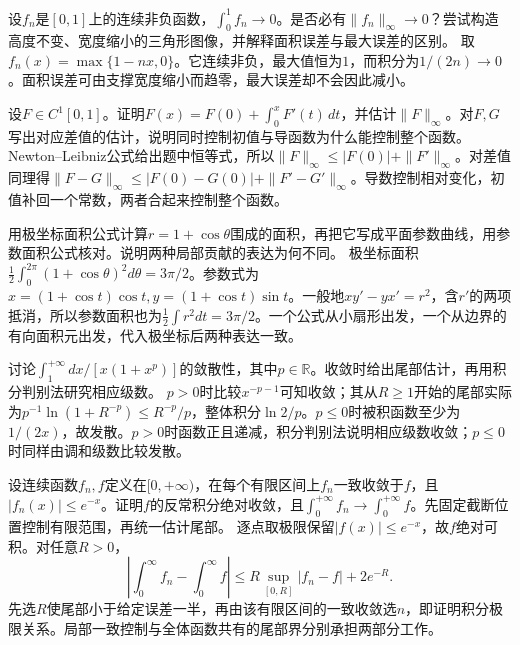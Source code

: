 设\(f_n\)是\([0,1]\)上的连续非负函数，\(\int_0^1f_n\to0\)。是否必有\(\|f_n\|_\infty\to0\)？尝试构造高度不变、宽度缩小的三角形图像，并解释面积误差与最大误差的区别。
\solutionanswer
取\(f_n(x)=\max\{1-nx,0\}\)。它连续非负，最大值恒为\(1\)，而积分为\(1/(2n)\to0\)。面积误差可由支撑宽度缩小而趋零，最大误差却不会因此减小。


设\(F\in C^1[0,1]\)。证明\(F(x)=F(0)+\int_0^xF'(t)\,dt\)，并估计\(\|F\|_\infty\)。对\(F,G\)写出对应差值的估计，说明同时控制初值与导函数为什么能控制整个函数。
\solutionanswer
Newton--Leibniz公式给出题中恒等式，所以\(\|F\|_\infty\le|F(0)|+\|F'\|_\infty\)。对差值同理得\(\|F-G\|_\infty\le|F(0)-G(0)|+\|F'-G'\|_\infty\)。导数控制相对变化，初值补回一个常数，两者合起来控制整个函数。


用极坐标面积公式计算\(r=1+\cos\theta\)围成的面积，再把它写成平面参数曲线，用参数面积公式核对。说明两种局部贡献的表达为何不同。
\solutionanswer
极坐标面积\(\frac12\int_0^{2\pi}(1+\cos\theta)^2d\theta=3\pi/2\)。参数式为\(x=(1+\cos t)\cos t,y=(1+\cos t)\sin t\)。一般地\(xy'-yx'=r^2\)，含\(r'\)的两项抵消，所以参数面积也为\(\frac12\int r^2dt=3\pi/2\)。一个公式从小扇形出发，一个从边界的有向面积元出发，代入极坐标后两种表达一致。


讨论\(\int_1^{+\infty}dx/[x(1+x^p)]\)的敛散性，其中\(p\in\mathbb R\)。收敛时给出尾部估计，再用积分判别法研究相应级数。
\solutionanswer
\(p>0\)时比较\(x^{-p-1}\)可知收敛；其从\(R\ge1\)开始的尾部实际为\(p^{-1}\ln(1+R^{-p})\le R^{-p}/p\)，整体积分\(\ln2/p\)。\(p\le0\)时被积函数至少为\(1/(2x)\)，故发散。\(p>0\)时函数正且递减，积分判别法说明相应级数收敛；\(p\le0\)时同样由调和级数比较发散。


设连续函数\(f_n,f\)定义在\([0,+\infty)\)，在每个有限区间上\(f_n\)一致收敛于\(f\)，且\(|f_n(x)|\le e^{-x}\)。证明\(f\)的反常积分绝对收敛，且\(\int_0^{+\infty}f_n\to\int_0^{+\infty}f\)。先固定截断位置控制有限范围，再统一估计尾部。
\solutionanswer
逐点取极限保留\(|f(x)|\le e^{-x}\)，故\(f\)绝对可积。对任意\(R>0\)，
\[
 \left|\int_0^\infty f_n-\int_0^\infty f\right|\le R\sup_{[0,R]}|f_n-f|+2e^{-R}.
\]
先选\(R\)使尾部小于给定误差一半，再由该有限区间的一致收敛选\(n\)，即证明积分极限关系。局部一致控制与全体函数共有的尾部界分别承担两部分工作。


